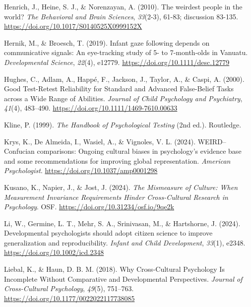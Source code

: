 \documentclass[
  man,floatsintext]{apa7}
\newlength{\cslhangindent}
\newenvironment{CSLReferences}[2] %
 {\begin{list}{}{%
  \setlength{\itemindent}{0pt}
  \setlength{\leftmargin}{0pt}
  \setlength{\parsep}{0pt}
  \ifodd #1
   \setlength{\leftmargin}{\cslhangindent}
   \setlength{\itemindent}{-1\cslhangindent}
  \fi
  \setlength{\itemsep}{#2\baselineskip}}}
 {\end{list}}
\begin{document}
\begin{CSLReferences}{1}{0}
Henrich, J., Heine, S. J., \& Norenzayan, A. (2010). The weirdest people in the world? \emph{The Behavioral and Brain Sciences}, \emph{33}(2-3), 61-83; discussion 83-135. \url{https://doi.org/10.1017/S0140525X0999152X}

Hernik, M., \& Broesch, T. (2019). Infant gaze following depends on communicative signals: {An} eye-tracking study of 5- to 7-month-olds in {Vanuatu}. \emph{Developmental Science}, \emph{22}(4), e12779. \url{https://doi.org/10.1111/desc.12779}

Hughes, C., Adlam, A., Happé, F., Jackson, J., Taylor, A., \& Caspi, A. (2000). Good {Test}-{Retest Reliability} for {Standard} and {Advanced False}-{Belief Tasks} across a {Wide Range} of {Abilities}. \emph{Journal of Child Psychology and Psychiatry}, \emph{41}(4), 483--490. \url{https://doi.org/10.1111/1469-7610.00633}

Kline, P. (1999). \emph{The {Handbook} of {Psychological Testing}} (2nd ed.). Routledge.

Krys, K., De Almeida, I., Wasiel, A., \& Vignoles, V. L. (2024). {WEIRD}--{Confucian} comparisons: {Ongoing} cultural biases in psychology's evidence base and some recommendations for improving global representation. \emph{American Psychologist}. \url{https://doi.org/10.1037/amp0001298}

Kusano, K., Napier, J., \& Jost, J. (2024). \emph{The {Mismeasure} of {Culture}: {When Measurement Invariance Requirements Hinder Cross-Cultural Research} in {Psychology}}. OSF. \url{https://doi.org/10.31234/osf.io/9qe2k}

Li, W., Germine, L. T., Mehr, S. A., Srinivasan, M., \& Hartshorne, J. (2024). Developmental psychologists should adopt citizen science to improve generalization and reproducibility. \emph{Infant and Child Development}, \emph{33}(1), e2348. \url{https://doi.org/10.1002/icd.2348}

Liebal, K., \& Haun, D. B. M. (2018). Why {Cross-Cultural Psychology Is Incomplete Without Comparative} and {Developmental Perspectives}. \emph{Journal of Cross-Cultural Psychology}, \emph{49}(5), 751--763. \url{https://doi.org/10.1177/0022022117738085}


\end{CSLReferences}
\end{document}
